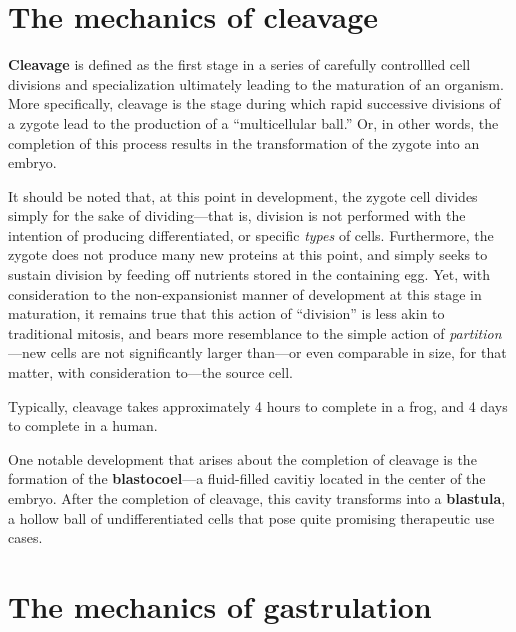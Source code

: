 \documentclass{article}
\begin{document}
\section{The mechanics of cleavage}

\textbf{Cleavage} is defined as the first stage in a series of carefully
controllled cell divisions and specialization ultimately leading to the
maturation of an organism. More specifically, cleavage is the stage
during which rapid successive divisions of a zygote lead to the production
of a ``multicellular ball.'' Or, in other words, the completion of this
process results in the transformation of the zygote into an embryo.

It should be noted that, at this point in development, the zygote cell
divides simply for the sake of dividing---that is, division is not performed
with the intention of producing differentiated, or specific \emph{types}
of cells. Furthermore, the zygote does not produce many new proteins at this
point, and simply seeks to sustain division by feeding off nutrients stored in
the containing egg. Yet, with consideration to the non-expansionist manner of
development at this stage in maturation, it remains true that this action of
``division'' is less akin to traditional mitosis, and bears more resemblance
to the simple action of \emph{partition}---new cells are not significantly
larger than---or even comparable in size, for that matter, with consideration
to---the source cell.

Typically, cleavage takes approximately 4 hours to complete in a frog, and 4
days to complete in a human.

One notable development that arises about the completion of cleavage is the
formation of the \textbf{blastocoel}---a fluid-filled cavitiy located in the
center of the embryo. After the completion of cleavage, this cavity transforms
into a \textbf{blastula}, a hollow ball of undifferentiated cells that pose
quite promising therapeutic use cases.

\section{The mechanics of gastrulation}
\end{document}
